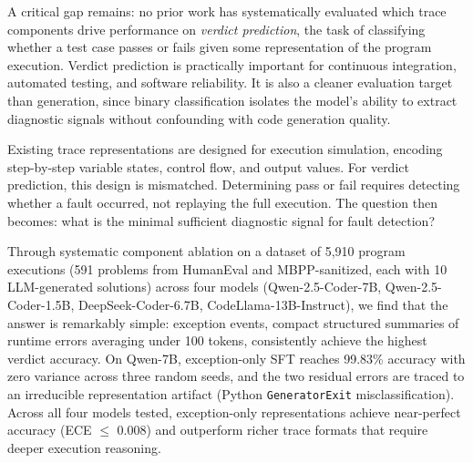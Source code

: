 \documentclass[11pt,a4paper]{article}
\begin{document}
A critical gap remains: no prior work has systematically evaluated which trace components drive performance on \emph{verdict prediction}, the task of classifying whether a test case passes or fails given some representation of the program execution. Verdict prediction is practically important for continuous integration, automated testing, and software reliability. It is also a cleaner evaluation target than generation, since binary classification isolates the model's ability to extract diagnostic signals without confounding with code generation quality.

Existing trace representations are designed for execution simulation, encoding step-by-step variable states, control flow, and output values. For verdict prediction, this design is mismatched. Determining pass or fail requires detecting whether a fault occurred, not replaying the full execution. The question then becomes: what is the minimal sufficient diagnostic signal for fault detection?

Through systematic component ablation on a dataset of 5,910 program executions (591 problems from HumanEval and MBPP-sanitized, each with 10 LLM-generated solutions) across four models (Qwen-2.5-Coder-7B, Qwen-2.5-Coder-1.5B, DeepSeek-Coder-6.7B, CodeLlama-13B-Instruct), we find that the answer is remarkably simple: exception events, compact structured summaries of runtime errors averaging under 100 tokens, consistently achieve the highest verdict accuracy. On Qwen-7B, exception-only SFT reaches 99.83\% accuracy with zero variance across three random seeds, and the two residual errors are traced to an irreducible representation artifact (Python \texttt{GeneratorExit} misclassification). Across all four models tested, exception-only representations achieve near-perfect accuracy (ECE $\leq$ 0.008) and outperform richer trace formats that require deeper execution reasoning.
\end{document}
